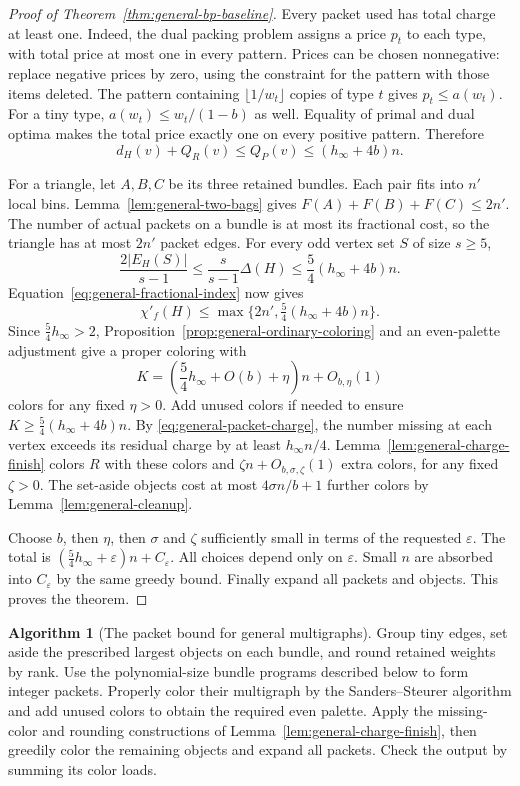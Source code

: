 \documentclass[11pt]{article}
\theoremstyle{definition}\newtheorem{algorithm}{Algorithm}[section]
\numberwithin{equation}{section}
\theoremstyle{remark}\newtheorem*{remark}{Remark}
\begin{document}
\begin{proof}[Proof of Theorem~\ref{thm:general-bp-baseline}]
Every packet used has total charge at least one. Indeed, the dual
packing problem assigns a price $p_t$ to each type, with total price
at most one in every pattern. Prices can be chosen nonnegative:
replace negative prices by zero, using the constraint for the pattern
with those items deleted. The pattern containing
$\lfloor1/w_t\rfloor$ copies of type $t$ gives $p_t\le a(w_t)$.
For a tiny type, $a(w_t)\le w_t/(1-b)$ as well. Equality of primal
and dual optima makes the total price exactly one on every positive
pattern. Therefore
\begin{equation}\label{eq:general-packet-charge}
 d_H(v)+Q_R(v)\le Q_P(v)\le(h_\infty+4b)n.
\end{equation}

For a triangle, let $A,B,C$ be its three retained bundles. Each pair
fits into $n'$ local bins. Lemma~\ref{lem:general-two-bags} gives
$F(A)+F(B)+F(C)\le2n'$. The number of actual packets on a bundle
is at most its fractional cost, so the triangle has at most $2n'$
packet edges. For every odd vertex set $S$ of size $s\ge5$,
\[
 \frac{2|E_H(S)|}{s-1}
 \le\frac{s}{s-1}\Delta(H)
 \le\frac54(h_\infty+4b)n.
\]
Equation~\eqref{eq:general-fractional-index} now gives
\[
 \chi'_f(H)\le\max\{2n',\tfrac54(h_\infty+4b)n\}.
\]
Since $\frac54h_\infty>2$, Proposition~\ref{prop:general-ordinary-coloring}
and an even-palette
adjustment give a proper coloring with
\[
 K=\left(\frac54h_\infty+O(b)+\eta\right)n+O_{b,\eta}(1)
\]
colors for any fixed $\eta>0$. Add unused colors if needed to ensure
$K\ge\frac54(h_\infty+4b)n$. By
\eqref{eq:general-packet-charge}, the number missing at each vertex
exceeds its residual charge by at least $h_\infty n/4$.
Lemma~\ref{lem:general-charge-finish} colors $R$ with these colors
and $\zeta n+O_{b,\sigma,\zeta}(1)$ extra colors, for any fixed
$\zeta>0$. The set-aside objects cost at most
$4\sigma n/b+1$ further colors by Lemma~\ref{lem:general-cleanup}.

Choose $b$, then $\eta$, then $\sigma$ and $\zeta$ sufficiently small
in terms of the requested $\varepsilon$. The total is
$(\frac54h_\infty+\varepsilon)n+C_\varepsilon$.
All choices depend only on $\varepsilon$. Small $n$ are absorbed
into $C_\varepsilon$ by the same greedy bound. Finally expand all
packets and objects. This proves the theorem.
\end{proof}

\begin{algorithm}[The packet bound for general multigraphs]
\label{alg:general-bp-baseline}
Group tiny edges, set aside the prescribed largest objects on each
bundle, and round retained weights by rank. Use the polynomial-size
bundle programs described below to form integer packets. Properly
color their multigraph by the Sanders--Steurer algorithm and add
unused colors to obtain the required even palette. Apply the
missing-color and rounding constructions of
Lemma~\ref{lem:general-charge-finish}, then greedily color the remaining
objects and expand all packets. Check the output by summing its color
loads.
\end{algorithm}
\end{document}
